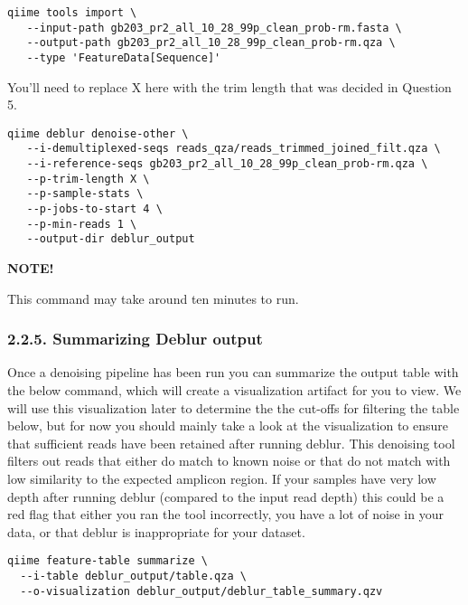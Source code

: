 \documentclass[
]{book}
\newenvironment{greenbox}{
  \definecolor{shadecolor}{RGB}{141, 181, 128}
  \color{white}
  \begin{shaded}}
 {\end{shaded}}
\begin{document}
\begin{verbatim}
qiime tools import \
   --input-path gb203_pr2_all_10_28_99p_clean_prob-rm.fasta \
   --output-path gb203_pr2_all_10_28_99p_clean_prob-rm.qza \
   --type 'FeatureData[Sequence]'
\end{verbatim}

You'll need to replace X here with the trim length that was decided in Question 5.

\begin{verbatim}
qiime deblur denoise-other \
   --i-demultiplexed-seqs reads_qza/reads_trimmed_joined_filt.qza \
   --i-reference-seqs gb203_pr2_all_10_28_99p_clean_prob-rm.qza \
   --p-trim-length X \
   --p-sample-stats \
   --p-jobs-to-start 4 \
   --p-min-reads 1 \
   --output-dir deblur_output
\end{verbatim}

\begin{greenbox}

\begin{center}
\textbf{NOTE!}

\end{center}

This command may take around ten minutes to run.

\end{greenbox}

\subsubsection{2.2.5. Summarizing Deblur output}\label{summarizing-deblur-output-1}

Once a denoising pipeline has been run you can summarize the output table with the below command, which will create a visualization artifact for you to view. We will use this visualization later to determine the the cut-offs for filtering the table below, but for now you should mainly take a look at the visualization to ensure that sufficient reads have been retained after running deblur. This denoising tool filters out reads that either do match to known noise or that do not match with low similarity to the expected amplicon region. If your samples have very low depth after running deblur (compared to the input read depth) this could be a red flag that either you ran the tool incorrectly, you have a lot of noise in your data, or that deblur is inappropriate for your dataset.

\begin{verbatim}
qiime feature-table summarize \
  --i-table deblur_output/table.qza \
  --o-visualization deblur_output/deblur_table_summary.qzv
\end{verbatim}
\end{document}
